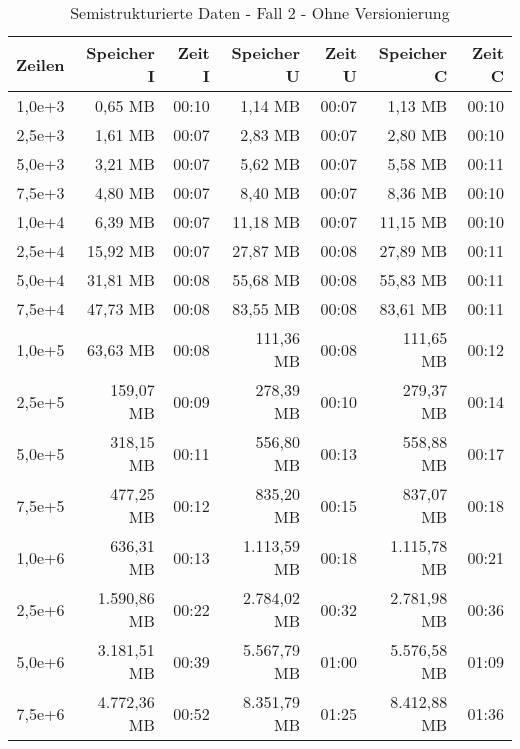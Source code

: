 \begin{table}
    \centering
    \begin{tabular}{|r|r|r|r|r|r|r|}
        \hline
        \textbf{Zeilen} & \textbf{Speicher I} & \textbf{Zeit I} & \textbf{Speicher U} & \textbf{Zeit U} & \textbf{Speicher C} & \textbf{Zeit C} \\ \hline
        1,0e+3  & 0,65 MB       & 00:10 & 1,14 MB       & 00:07 & 1,13 MB       & 00:10 \\ \hline
        2,5e+3  & 1,61 MB       & 00:07 & 2,83 MB       & 00:07 & 2,80 MB       & 00:10 \\ \hline
        5,0e+3  & 3,21 MB       & 00:07 & 5,62 MB       & 00:07 & 5,58 MB       & 00:11 \\ \hline
        7,5e+3  & 4,80 MB       & 00:07 & 8,40 MB       & 00:07 & 8,36 MB       & 00:10 \\ \hline
        1,0e+4  & 6,39 MB       & 00:07 & 11,18 MB      & 00:07 & 11,15 MB      & 00:10 \\ \hline
        2,5e+4  & 15,92 MB      & 00:07 & 27,87 MB      & 00:08 & 27,89 MB      & 00:11 \\ \hline
        5,0e+4  & 31,81 MB      & 00:08 & 55,68 MB      & 00:08 & 55,83 MB      & 00:11 \\ \hline
        7,5e+4  & 47,73 MB      & 00:08 & 83,55 MB      & 00:08 & 83,61 MB      & 00:11 \\ \hline
        1,0e+5  & 63,63 MB      & 00:08 & 111,36 MB     & 00:08 & 111,65 MB     & 00:12 \\ \hline
        2,5e+5  & 159,07 MB     & 00:09 & 278,39 MB     & 00:10 & 279,37 MB     & 00:14 \\ \hline
        5,0e+5  & 318,15 MB     & 00:11 & 556,80 MB     & 00:13 & 558,88 MB     & 00:17 \\ \hline
        7,5e+5  & 477,25 MB     & 00:12 & 835,20 MB     & 00:15 & 837,07 MB     & 00:18 \\ \hline
        1,0e+6  & 636,31 MB     & 00:13 & 1.113,59 MB   & 00:18 & 1.115,78 MB   & 00:21 \\ \hline
        2,5e+6  & 1.590,86 MB   & 00:22 & 2.784,02 MB   & 00:32 & 2.781,98 MB   & 00:36 \\ \hline
        5,0e+6  & 3.181,51 MB   & 00:39 & 5.567,79 MB   & 01:00 & 5.576,58 MB   & 01:09 \\ \hline
        7,5e+6  & 4.772,36 MB   & 00:52 & 8.351,79 MB   & 01:25 & 8.412,88 MB   & 01:36 \\ \hline
    \end{tabular}
    \caption{Semistrukturierte Daten - Fall 2 - Ohne Versionierung}
\end{table}

